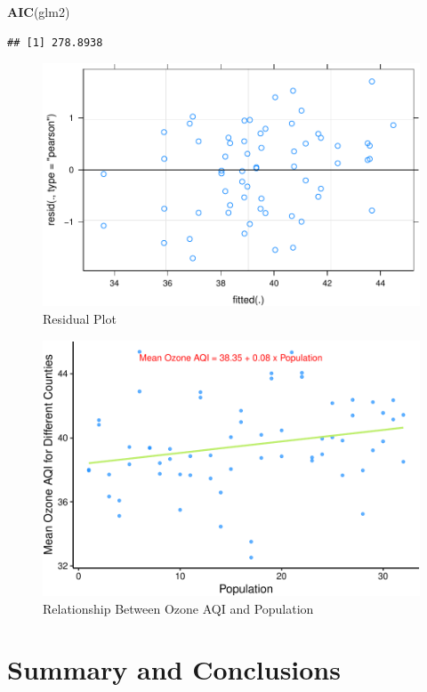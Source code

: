 \documentclass[12pt,]{article}
\newenvironment{Shaded}{\begin{snugshade}}{\end{snugshade}}
\newcommand{\KeywordTok}[1]{\textcolor[rgb]{0.13,0.29,0.53}{\textbf{#1}}}
\newcommand{\NormalTok}[1]{#1}
\begin{document}
\begin{Shaded}
\begin{Highlighting}[]
\KeywordTok{AIC}\NormalTok{(glm2)}
\end{Highlighting}
\end{Shaded}

\begin{verbatim}
## [1] 278.8938
\end{verbatim}

\begin{figure}
\centering
\includegraphics{Xia_ENV_872_Project_files/figure-latex/Final visualization 5-1.pdf}
\caption{Residual Plot}
\end{figure}

\begin{figure}
\centering
\includegraphics{Xia_ENV_872_Project_files/figure-latex/Final visualization 4-1.pdf}
\caption{Relationship Between Ozone AQI and Population}
\end{figure}

\newpage

\section{Summary and Conclusions}\label{summary-and-conclusions}
\end{document}
